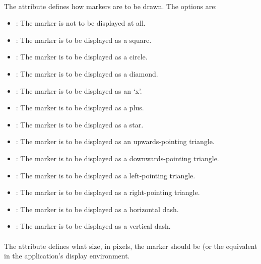 \paragraph*{}

The  attribute defines how markers are to be drawn.  The options are:

\begin{itemize}
        \item \textbf{}: The marker is not to be displayed at all.
        \item \textbf{}: The marker is to be displayed as a square.
        \item \textbf{}: The marker is to be displayed as a circle.
        \item \textbf{}: The marker is to be displayed as a diamond.
        \item \textbf{}: The marker is to be displayed as an `x'.
        \item \textbf{}: The marker is to be displayed as a plus.
        \item \textbf{}: The marker is to be displayed as a star.
        \item \textbf{}: The marker is to be displayed as an upwards-pointing triangle.
        \item \textbf{}: The marker is to be displayed as a downwards-pointing triangle.
        \item \textbf{}: The marker is to be displayed as a left-pointing triangle.
        \item \textbf{}: The marker is to be displayed as a right-pointing triangle.
        \item \textbf{}: The marker is to be displayed as a horizontal dash.
        \item \textbf{}: The marker is to be displayed as a vertical dash.
\end{itemize}

\paragraph*{}

The  attribute defines what size, in pixels, the marker should be (or the equivalent in the application's display environment.


